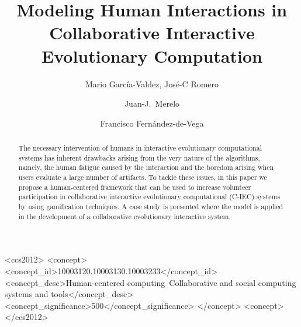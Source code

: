 \documentclass[sigconf]{acmart}
\begin{document}
\title{Modeling Human Interactions in Collaborative Interactive 
 Evolutionary Computation}

\author{Mario Garc\'ia-Valdez, Jos\'e-C Romero}


\author{Juan-J.~Merelo}

\author{Francisco Fern\'andez-de-Vega}


\begin{abstract} The necessary intervention of humans in interactive
evolutionary computational systems has inherent drawbacks arising from the
very nature of the algorithms, namely, the human fatigue caused by the
interaction and the boredom arising when users evaluate a large number of
artifacts. To tackle these issues, in this paper we propose a human-centered
framework that can be used to increase volunteer participation in collaborative interactive evolutionary computational (C-IEC)
systems by using gamification techniques. A case study is
presented where the model is applied in the development of a collaborative
evolutionary interactive system.
\end{abstract}

%
%
\begin{CCSXML}
<ccs2012>
<concept>
<concept_id>10003120.10003130.10003233</concept_id>
<concept_desc>Human-centered computing~Collaborative and social computing systems and tools</concept_desc>
<concept_significance>500</concept_significance>
</concept>
<concept>
</ccs2012>
\end{CCSXML}



\maketitle




 
\end{document}
